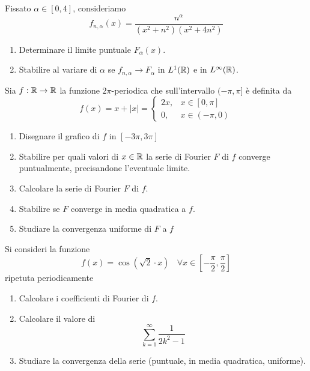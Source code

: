 Fissato $\alpha \in [ 0,4]$, consideriamo
\begin{equation*}
f_{n,\alpha }( x) =\frac{n^{\alpha }}{\left( x^{2} +n^{2}\right)\left( x^{2} +4n^{2}\right)}
\end{equation*}
\begin{enumerate}
\item Determinare il limite puntuale $F_{\alpha }( x)$.
\item Stabilire al variare di $\alpha $ se $f_{n,\alpha }\rightarrow F_{\alpha }$ in $L^{1}(\mathbb{R} )$ e in $L^{\infty }(\mathbb{R} )$.
\end{enumerate}
\Esercizio{}

Sia $f:\mathbb{R} \rightarrow \mathbb{R} $ la funzione $2\pi $-periodica che sull'intervallo $( -\pi ,\pi ]$ è definita da
\begin{equation*}
f( x) =x+| x| =\begin{cases}
2x, & x\in [ 0,\pi ]\\
0, & x\in ( -\pi ,0)
\end{cases}
\end{equation*}
\begin{enumerate}
\item Disegnare il grafico di $f$ in $[ -3\pi ,3\pi ]$
\item Stabilire per quali valori di $x\in \mathbb{R} $ la serie di Fourier $F$ di $f$ converge puntualmente, precisandone l'eventuale limite.
\item Calcolare la serie di Fourier $F$ di $f$.
\item Stabilire se $F$ converge in media quadratica a $f$.
\item Studiare la convergenza uniforme di $F$ a $f$
\end{enumerate}
\Esercizio{}

Si consideri la funzione
\begin{equation*}
f( x) =\cos\left(\sqrt{2} \cdotp x\right) \ \ \ \ \forall x\in \left[ -\frac{\pi }{2} ,\frac{\pi }{2}\right]
\end{equation*}
ripetuta periodicamente
\begin{enumerate}
\item Calcolare i coefficienti di Fourier di $f$.
\item Calcolare il valore di\begin{equation*}
\sum\limits ^{\infty }_{k=1}\frac{1}{2k^{2} -1}
\end{equation*}
\item Studiare la convergenza della serie (puntuale, in media quadratica, uniforme).
\end{enumerate}
\ParteSoluzioni
\Soluzione


